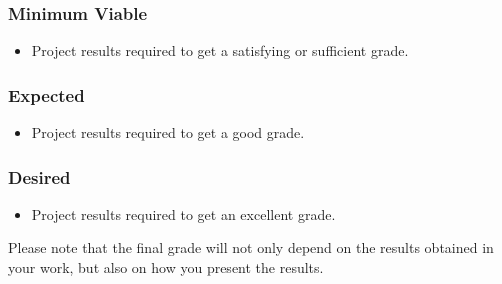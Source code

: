 \documentclass[thesis]{mas_proposal}
\begin{document}
\subsubsection*{Minimum Viable}
\begin{itemize}
    \item Project results required to get a satisfying or sufficient grade.
\end{itemize}

\subsubsection*{Expected}
\begin{itemize}
    \item Project results required to get a good grade.
\end{itemize}

\subsubsection*{Desired}
\begin{itemize}
    \item Project results required to get an excellent grade.
\end{itemize}

Please note that the final grade will not only depend on the results obtained in your work, but also on how you present the results.

\nocite{*}

\end{document}
